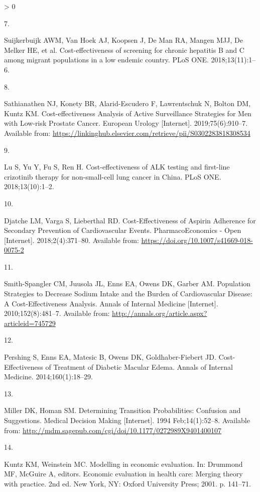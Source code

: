 \documentclass[
]{article}
\newlength{\cslhangindent}
\newlength{\csllabelwidth}
\newenvironment{CSLReferences}[2] %
 {%
  \setlength{\parindent}{0pt}
  \ifodd #1 \everypar{\setlength{\hangindent}{\cslhangindent}}\ignorespaces\fi
  \ifnum #2 > 0
  \setlength{\parskip}{#2\baselineskip}
  \fi
 }%
 {}
\newcommand{\CSLLeftMargin}[1]{\parbox[t]{\csllabelwidth}{#1}}
\newcommand{\CSLRightInline}[1]{\parbox[t]{\linewidth - \csllabelwidth}{#1}\break}
\begin{document}
\begin{CSLReferences}{0}{0}
\leavevmode\hypertarget{ref-Suijkerbuijk2018}{}%
\CSLLeftMargin{7. }
\CSLRightInline{Suijkerbuijk AWM, Van Hoek AJ, Koopsen J, De Man RA, Mangen MJJ, De Melker HE, et al. {Cost-effectiveness of screening for chronic hepatitis B and C among migrant populations in a low endemic country}. PLoS ONE. 2018;13(11):1--6. }

\leavevmode\hypertarget{ref-Sathianathen2018a}{}%
\CSLLeftMargin{8. }
\CSLRightInline{Sathianathen NJ, Konety BR, Alarid-Escudero F, Lawrentschuk N, Bolton DM, Kuntz KM. {Cost-effectiveness Analysis of Active Surveillance Strategies for Men with Low-risk Prostate Cancer}. European Urology {[}Internet{]}. 2019;75(6):910--7. Available from: \url{https://linkinghub.elsevier.com/retrieve/pii/S0302283818308534}}

\leavevmode\hypertarget{ref-Lu2018b}{}%
\CSLLeftMargin{9. }
\CSLRightInline{Lu S, Yu Y, Fu S, Ren H. {Cost-effectiveness of ALK testing and first-line crizotinib therapy for non-small-cell lung cancer in China}. PLoS ONE. 2018;13(10):1--2. }

\leavevmode\hypertarget{ref-Djatche2018}{}%
\CSLLeftMargin{10. }
\CSLRightInline{Djatche LM, Varga S, Lieberthal RD. {Cost-Effectiveness of Aspirin Adherence for Secondary Prevention of Cardiovascular Events}. PharmacoEconomics - Open {[}Internet{]}. 2018;2(4):371--80. Available from: \url{https://doi.org/10.1007/s41669-018-0075-2}}

\leavevmode\hypertarget{ref-Smith-Spangler2010}{}%
\CSLLeftMargin{11. }
\CSLRightInline{Smith-Spangler CM, Juusola JL, Enns EA, Owens DK, Garber AM. {Population Strategies to Decrease Sodium Intake and the Burden of Cardiovascular Disease: A Cost-Effectiveness Analysis}. Annals of Internal Medicine {[}Internet{]}. 2010;152(8):481--7. Available from: \url{http://annals.org/article.aspx?articleid=745729}}

\leavevmode\hypertarget{ref-Pershing2014}{}%
\CSLLeftMargin{12. }
\CSLRightInline{Pershing S, Enns EA, Matesic B, Owens DK, Goldhaber-Fiebert JD. {Cost-Effectiveness of Treatment of Diabetic Macular Edema}. Annals of Internal Medicine. 2014;160(1):18--29. }

\leavevmode\hypertarget{ref-Miller1994}{}%
\CSLLeftMargin{13. }
\CSLRightInline{Miller DK, Homan SM. {Determining Transition Probabilities: Confusion and Suggestions}. Medical Decision Making {[}Internet{]}. 1994 Feb;14(1):52--8. Available from: \url{http://mdm.sagepub.com/cgi/doi/10.1177/0272989X9401400107}}

\leavevmode\hypertarget{ref-Kuntz2001}{}%
\CSLLeftMargin{14. }
\CSLRightInline{Kuntz KM, Weinstein MC. {Modelling in economic evaluation}. In: Drummond MF, McGuire A, editors. Economic evaluation in health care: Merging theory with practice. 2nd ed. New York, NY: Oxford University Press; 2001. p. 141--71. }


\end{CSLReferences}
\end{document}
